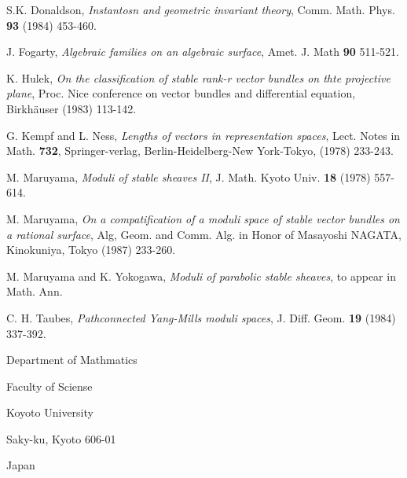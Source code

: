 \begin{thebibliography}{99}
 S.K. Donaldson, \textit{Instantosn and geometric invariant theory}, Comm. Math. Phys. {\bf 93} (1984) 453-460.

 J. Fogarty, \textit{Algebraic families on an algebraic surface}, Amet. J. Math {\bf 90} 511-521.

 K. Hulek, \textit{On the classification of stable rank-r vector bundles on thte projective plane}, Proc. Nice conference on vector bundles and differential equation, Birkh\"auser (1983) 113-142.

 G. Kempf and L. Ness, \textit{Lengths of vectors in  representation spaces}, Lect. Notes in Math.
{\bf 732}, Springer-verlag, Berlin-Heidelberg-New York-Tokyo, (1978) 233-243.

 M. Maruyama, \textit{Moduli of stable sheaves II}, J. Math. Kyoto Univ. {\bf 18}
(1978) 557-614.

 M. Maruyama, \textit{On a compatification of a moduli space of stable vector bundles on a rational surface}, Alg, Geom. and Comm. Alg. in Honor of Masayoshi NAGATA, Kinokuniya, Tokyo (1987) 233-260.

 M. Maruyama and K. Yokogawa, \textit{Moduli of parabolic stable sheaves}, to appear in Math. Ann.

 C. H. Taubes, \textit{Pathconnected Yang-Mills moduli spaces}, J. Diff. Geom. {\bf 19} (1984) 337-392.
\end{thebibliography}
\begin{flushleft}
Department of Mathmatics

Faculty of Sciense

Koyoto University

Saky-ku, Kyoto 606-01

Japan
\end{flushleft}




